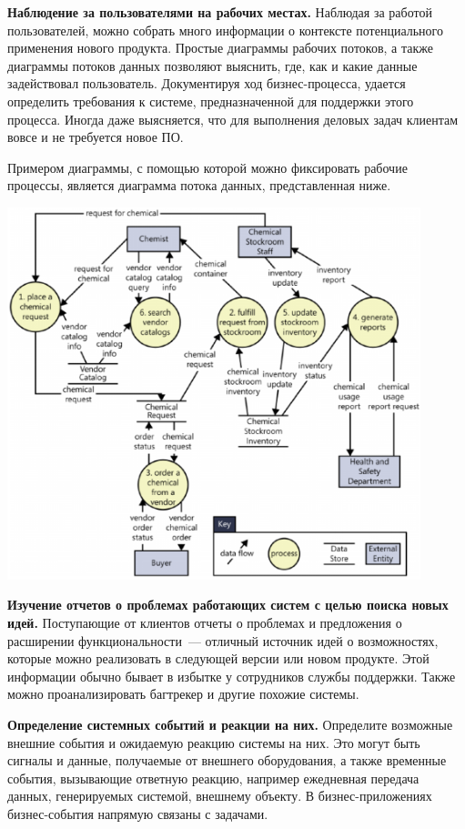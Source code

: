 \documentclass{../../text-style}
\begin{document}
\textbf{Наблюдение за пользователями на рабочих местах.}
Наблюдая за работой пользователей, можно собрать много информации о контексте потенциального применения нового продукта.
Простые диаграммы рабочих потоков, а также диаграммы потоков данных позволяют выяснить, где, как и какие данные задействовал пользователь.
Документируя ход бизнес-процесса, удается определить требования к системе, предназначенной для поддержки этого процесса.
Иногда даже выясняется, что для выполнения деловых задач клиентам вовсе и не требуется новое ПО.

Примером диаграммы, с помощью которой можно фиксировать рабочие процессы, является диаграмма потока данных, представленная ниже.

\begin{center}
    \includegraphics[width=0.9\textwidth]{dfd.png}
\end{center}

\textbf{Изучение отчетов о проблемах работающих систем с целью поиска новых идей.}
Поступающие от клиентов отчеты о проблемах и предложения о расширении функциональности~--- отличный источник идей о возможностях, которые можно реализовать в следующей версии или новом продукте.
Этой информации обычно бывает в избытке у сотрудников службы поддержки.
Также можно проанализировать багтрекер и другие похожие системы.

\textbf{Определение системных событий и реакции на них.}
Определите возможные внешние события и ожидаемую реакцию системы на них.
Это могут быть сигналы и данные, получаемые от внешнего оборудования, а также временные события, вызывающие ответную реакцию, например ежедневная передача данных, генерируемых системой, внешнему объекту.
В бизнес-приложениях бизнес-события напрямую связаны с задачами.
\end{document}
